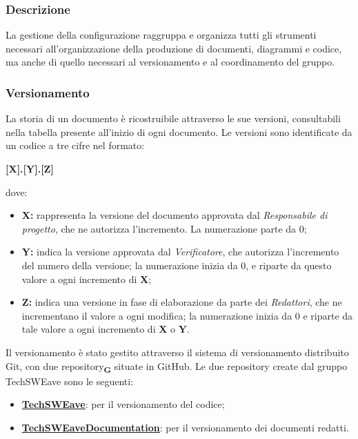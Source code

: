         \subsubsection{Descrizione}
        La gestione della configurazione raggruppa e organizza tutti gli strumenti necessari all'organizzazione della produzione di documenti, diagrammi e codice, ma anche di quello necessari al versionamento e al coordinamento del gruppo.
        \subsubsection{Versionamento}
        La storia di un documento è ricostruibile attraverso le sue versioni, consultabili nella tabella presente all'inizio di ogni documento. Le versioni sono identificate da un codice a tre cifre nel formato: 
        \begin{center}
            \textbf{\large [X].[Y].[Z]}\\             
        \end{center}
        dove: 
        \begin{itemize}
            \item \textbf{\large X:} rappresenta la versione del documento approvata dal \textit{Responsabile di progetto}, che ne autorizza l'incremento. La numerazione parte da 0;
            \item \textbf{\large Y:} indica la versione approvata dal \textit{Verificatore}, che autorizza l’incremento del numero della versione; la numerazione inizia da 0, e riparte da questo valore a ogni incremento di \textbf{X};
            \item \textbf{\large Z:} indica una versione in fase di elaborazione da parte dei \textit{Redattori}, che ne incrementano il valore a ogni modifica; la numerazione inizia da 0 e riparte da tale valore a ogni incremento di \textbf{X} o \textbf{Y}.
        \end{itemize}
        Il versionamento è stato gestito attraverso il sistema di versionamento distribuito Git, con due repository\textsubscript{\textbf{G}} situate in GitHub.
        Le due repository create dal gruppo TechSWEave sono le seguenti:
        \begin{itemize}
            \item \textcolor{blue}{\underline{\textbf{\href{https://github.com/techsweave/TechSWEave.git}{TechSWEave}}}}: per il versionamento del codice;
            \item \textcolor{blue}{\underline{\textbf{\href{https://github.com/techsweave/TechSWEaveDocumentation.git}{TechSWEaveDocumentation}}}}: per il versionamento dei documenti redatti.
        \end{itemize}

